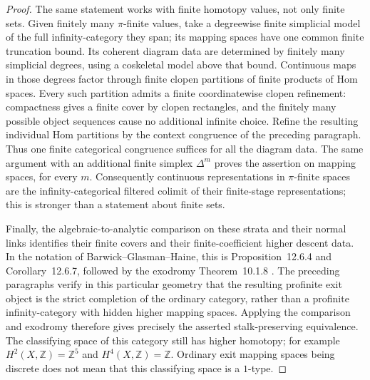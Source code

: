 \begin{proof}
The same statement works with finite homotopy values, not only finite
sets. Given finitely many $\pi$-finite values, take a degreewise finite
simplicial model of the full infinity-category they span; its mapping
spaces have one common finite truncation bound. Its coherent diagram
data are determined by finitely many simplicial degrees, using a
coskeletal model above that bound. Continuous maps in those degrees
factor through finite clopen partitions of finite products of Hom
spaces. Every such partition admits a finite coordinatewise clopen
refinement: compactness gives a finite cover by clopen rectangles,
and the finitely many possible object sequences cause no additional
infinite choice. Refine the resulting individual Hom partitions by
the context congruence of the preceding paragraph. Thus one finite
categorical congruence suffices for all the diagram data.
The same argument with an additional finite simplex
$\Delta^m$ proves the assertion on mapping spaces, for every $m$.
Consequently continuous representations in $\pi$-finite spaces are the
infinity-categorical filtered colimit of their finite-stage
representations; this is stronger than a statement about finite sets.

Finally, the algebraic-to-analytic comparison on these strata and their
normal links identifies their finite covers and their finite-coefficient
higher descent data. In the notation of Barwick--Glasman--Haine, this
is Proposition~12.6.4 and Corollary~12.6.7, followed by the exodromy
Theorem~10.1.8 \cite{BGH2020}. The preceding paragraphs verify in this
particular geometry that the resulting profinite exit object is the
strict completion of the ordinary category, rather than a profinite
infinity-category with hidden higher mapping spaces. Applying the
comparison and exodromy therefore gives precisely the asserted
stalk-preserving equivalence. The classifying space of this category
still has higher homotopy; for example $H^2(X,\mathbb Z)=\mathbb Z^5$
and $H^4(X,\mathbb Z)=\mathbb Z$. Ordinary exit mapping spaces being
discrete does not mean that this classifying space is a $1$-type.
\end{proof}

